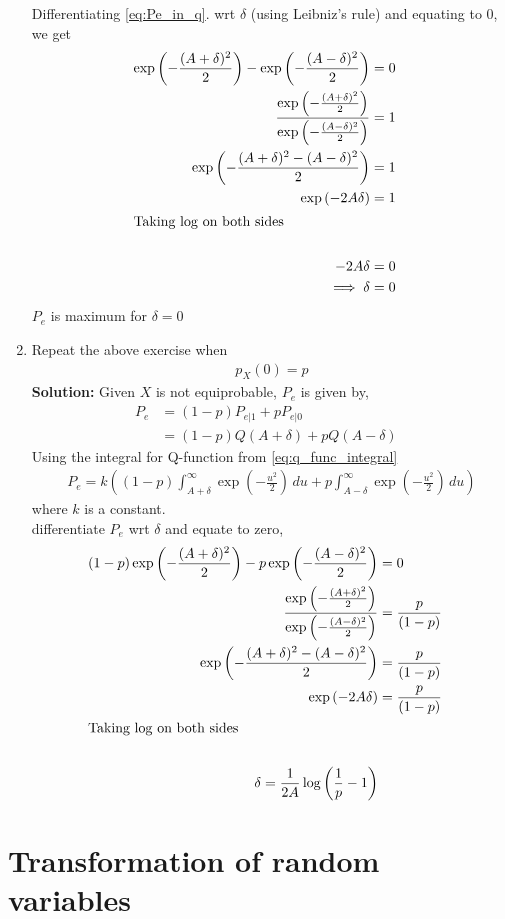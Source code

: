 \documentclass{article}
\numberwithin{equation}{subsection}
\numberwithin{figure}{subsection}
\newcommand{\solution}{\noindent \textbf{Solution: }}
\renewcommand\thesection{\arabic{section}}
\renewcommand\thesubsection{\thesection.\arabic{subsection}}
\begin{document}
\begin{enumerate}[label=\thesubsection.\arabic*,ref=\thesubsection.\arabic{figure}]
Differentiating \ref{eq:Pe_in_q}. wrt $\delta$ (using Leibniz's rule) and equating to $0$, we get
\begin{align*}
	\exp\left(-\frac{(A+\delta)^2}{2}\right)-\exp\left(-\frac{(A-\delta)^2}{2}\right) &= 0&\\
	\frac{\exp\left(-\frac{(A+\delta)^2}{2}\right)}{\exp\left(-\frac{(A-\delta)^2}{2}\right)} &= 1&\\
	\exp\left(-\frac{(A+\delta)^2-(A-\delta)^2}{2}\right) &= 1&\\
	\exp\left(-2A\delta\right) &= 1&\\
	\intertext{Taking $\log$ on both sides}\\
	-2A\delta &= 0&\\
	\implies \delta &= 0
\end{align*}
$P_e$ is maximum for $\delta = 0$
\item Repeat the above exercise when 
	\begin{align}
		p_{X}(0) = p
	\end{align}
	\solution Given $X$ is not equiprobable, $P_e$ is given by,
\begin{align}
	P_e &= (1-p)P_{e|1} + pP_{e|0}&\\
	&= (1-p)Q(A+\delta) + pQ(A-\delta)
\end{align}
Using the integral for Q-function from \ref{eq:q_func_integral}
\begin{align}
	P_e = k((1-p)\int_{A+\delta}^\infty \exp\left(-\frac{u^2}{2}\right) \, du + 
	p\int_{A-\delta}^\infty \exp\left(-\frac{u^2}{2}\right) \, du)
\end{align}
where $k$ is a constant.\\
differentiate $P_e$ wrt $\delta$ and equate to zero,
\begin{align*}
	(1-p)\exp\left(-\frac{(A+\delta)^2}{2}\right)-p\exp\left(-\frac{(A-\delta)^2}{2}\right) &= 0&\\
	\frac{\exp\left(-\frac{(A+\delta)^2}{2}\right)}{\exp\left(-\frac{(A-\delta)^2}{2}\right)} &= \frac{p}{(1-p)}&\\
	\exp\left(-\frac{(A+\delta)^2-(A-\delta)^2}{2}\right) &= \frac{p}{(1-p)}&\\
	\exp\left(-2A\delta\right) &= \frac{p}{(1-p)}&\\
	\intertext{Taking $\log$ on both sides}\\
	\delta = \frac{1}{2A}\log\left(\frac{1}{p}-1\right)
\end{align*}
\end{enumerate}
%
\section{Transformation of random variables}	
\end{document}
